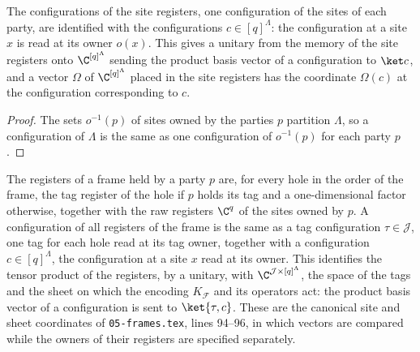 \begin{lemma}
    \label{lem:lattice_site_register_coordinates}
    \leanok
    The configurations of the site registers, one configuration of the sites
    of each party, are identified with the configurations $c\in[q]^\Lambda$:
    the configuration at a site $x$ is read at its owner $o(x)$. This gives a
    unitary from the memory of the site registers onto $\C^{[q]^\Lambda}$
    sending the product basis vector of a configuration to $\ket c$, and a
    vector $\Omega$ of $\C^{[q]^\Lambda}$ placed in the site registers has the
    coordinate $\Omega(c)$ at the configuration corresponding to $c$.
\end{lemma}

\begin{proof}\leanok
    The sets $o^{-1}(p)$ of sites owned by the parties $p$ partition
    $\Lambda$, so a configuration of $\Lambda$ is the same as one
    configuration of $o^{-1}(p)$ for each party $p$.
\end{proof}

\begin{lemma}
    \label{lem:peps_frame_registers_coordinates}
    \leanok
    The registers of a frame held by a party $p$ are, for every hole in the
    order of the frame, the tag register of the hole if $p$ holds its tag and
    a one-dimensional factor otherwise, together with the raw registers $\C^q$
    of the sites owned by $p$. A configuration of all registers of the frame
    is the same as a tag configuration $\tau\in\mathcal J$, one tag for each
    hole read at its tag owner, together with a configuration
    $c\in[q]^\Lambda$, the configuration at a site $x$ read at its owner.
    This identifies the tensor product of the registers, by a unitary, with
    $\C^{\mathcal J\times[q]^\Lambda}$, the space of the tags and the sheet on
    which the encoding $K_{\mathcal F}$ and its operators act: the product
    basis vector of a configuration is sent to $\ket{\tau,c}$. These are the
    canonical site and sheet coordinates of \texttt{05-frames.tex}, lines
    94--96, in which vectors are compared while the owners of their
    registers are specified separately.
\end{lemma}

